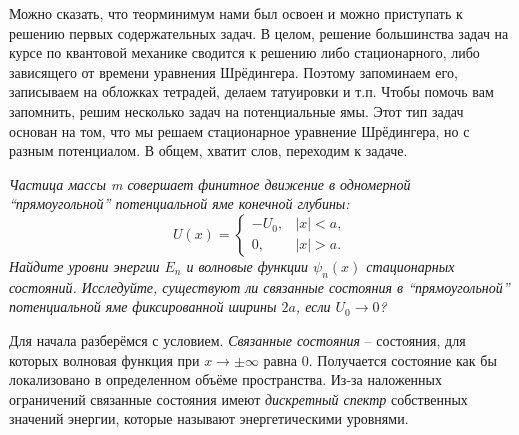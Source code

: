Можно сказать, что теорминимум нами был освоен и можно приступать к решению первых содержательных задач. В целом, решение большинства задач на курсе по квантовой механике сводится к решению либо стационарного, либо зависящего от времени уравнения Шрёдингера. Поэтому запоминаем его, записываем на обложках тетрадей, делаем татуировки и т.п. Чтобы помочь вам запомнить, решим несколько задач на потенциальные ямы. Этот тип задач основан на том, что мы решаем стационарное уравнение Шрёдингера, но с разным потенциалом. В общем, хватит слов, переходим к задаче.
\begin{center}
    \textit{Частица массы m совершает финитное движение в одномерной ``прямоугольной'' потенциальной яме конечной глубины:}
    \[
    U(x) = 
    \begin{cases}
    -U_0,& |x| < a,\\
    0, & |x| > a.
    \end{cases}
    \]
    \textit{Найдите уровни энергии $E_n$ и волновые функции $\psi_n(x)$ стационарных состояний. Исследуйте, существуют ли связанные состояния в ``прямоугольной'' потенциальной яме фиксированной ширины $2a$, если $U_0 \rightarrow 0$?}
\end{center}
Для начала разберёмся с условием. \textit{Связанные состояния} – состояния, для которых волновая функция при $x \rightarrow \pm\infty$ равна 0. Получается состояние как бы локализовано в определенном объёме пространства. Из-за наложенных ограничений связанные состояния имеют \textit{дискретный спектр} собственных значений энергии, которые называют энергетическими уровнями.

